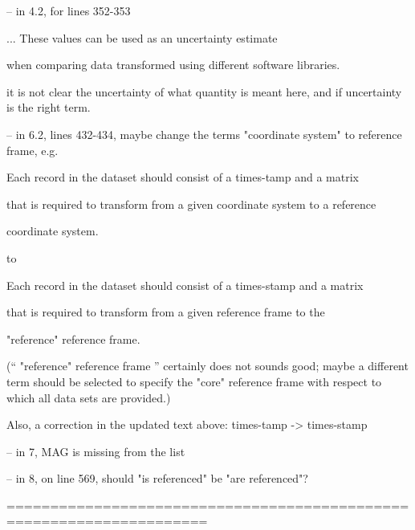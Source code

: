  

 

-- in 4.2, for lines 352-353

 

      ... These values can be used as an uncertainty estimate

      when comparing data transformed using different software libraries.

 

   it is not clear the uncertainty of what quantity is meant here, and if uncertainty is the right term.

 

 

-- in 6.2, lines 432-434, maybe change the terms "coordinate system" to reference frame, e.g.

 

      Each record in the dataset should consist of a times-tamp and a matrix

      that is required to transform from a given coordinate system to a reference

      coordinate system.

 

   to

 

      Each record in the dataset should consist of a times-stamp and a matrix

      that is required to transform from a given reference frame to the

      "reference" reference frame.

 

   (`` "reference" reference frame '' certainly does not sounds good; maybe a different term should be selected to specify the "core" reference frame with respect to which all data sets are provided.)

 

   Also, a correction in the updated text above: times-tamp -> times-stamp

 

 

-- in 7, MAG is missing from the list

 

 

-- in 8, on line 569, should "is referenced" be "are referenced"?

 

 

=====================================================================

